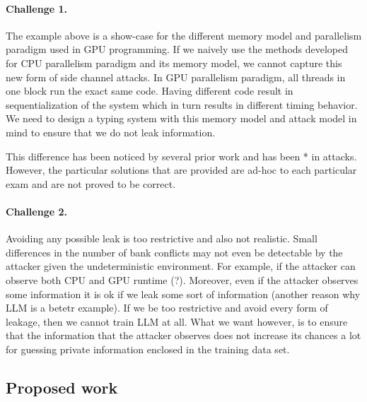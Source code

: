 \paragraph{Challenge 1.} The example above is a show-case for the different memory model and parallelism paradigm used in GPU programming. If we naively use the methods developed for CPU parallelism paradigm and its memory model, we cannot capture this new form of side channel attacks.
%
In GPU parallelism paradigm, all threads in one block run the exact same code. 
%
Having different code result in sequentialization of the system which in turn results in different timing behavior. 
%
We need to design a typing system with this memory model and attack model in mind to ensure that we do not leak information.


This difference has been noticed by several prior work and has been * in attacks. However, the particular solutions that are provided are ad-hoc to each particular exam and are not proved to be correct.
%




\paragraph{Challenge 2.} Avoiding any possible leak is too restrictive and also not realistic. 
%
Small differences in the number of bank conflicts may not even be detectable by the attacker given the undeterministic environment.
%
For example, if the attacker can observe both CPU and GPU runtime (?).
%
Moreover, even if the attacker observes some information it is ok if we leak some sort of information (another reason why LLM is a betetr example).
%
If we be too restrictive and avoid every form of leakage, then we cannot train LLM at all. 
%
What we want however, is to ensure that the information that the attacker observes does not increase its chances a lot for guessing private information enclosed in the training data set.



%









\subsection{Proposed work}



